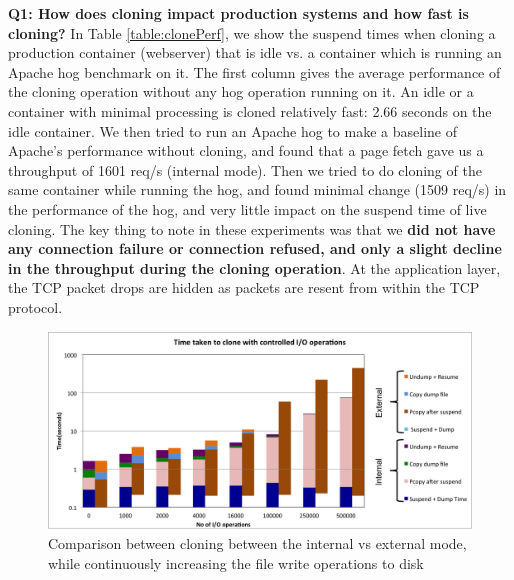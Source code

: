
\noindent \textbf{ Q1: How does cloning impact production systems and how fast is cloning?  }
In Table \ref {table:clonePerf}, we show the suspend times when cloning a production container (webserver) that is idle vs. a container which is running an Apache hog benchmark \cite{httperf} on it. 
The first column gives the average performance of the cloning operation without any hog operation running on it.  
An idle or a container with minimal processing is cloned relatively fast: 2.66 seconds on the idle container. 
We then tried to run an Apache hog to make a baseline of Apache's performance without cloning, and found that a page fetch gave us a throughput of 1601 req/s (internal mode). Then we tried to do cloning of the same container while running the hog, and found minimal change (1509 req/s) in the performance of the hog, and very little impact on the suspend time of live cloning.
The key thing to note in these experiments was that we \textbf{did not have any connection failure or connection refused, and only a slight decline in the throughput during the cloning operation}. 
At the application layer, the TCP packet drops are hidden as packets are resent from within the TCP protocol.
\iffalse
\begin{figure}[t]
	\begin{center}
		\includegraphics[width=1\textwidth]{figs/fioResult.png}
		\caption{Comparison between cloning between the internal vs external mode, while continuously increasing the file write operations to disk}
		\label{fig:fioResults}
	\end{center}
\end{figure}
